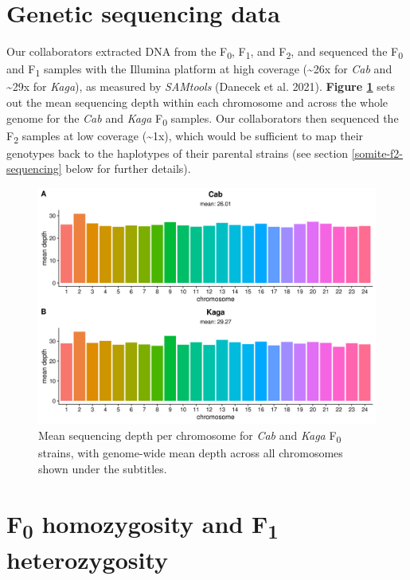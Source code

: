 \documentclass[
]{book}
\begin{document}
\clearpage

\hypertarget{genetic-sequencing-data}{%
\section{Genetic sequencing data}\label{genetic-sequencing-data}}

Our collaborators extracted DNA from the F\textsubscript{0}, F\textsubscript{1}, and F\textsubscript{2}, and sequenced the F\textsubscript{0} and F\textsubscript{1} samples with the Illumina platform at high coverage (\textasciitilde26x for \emph{Cab} and \textasciitilde29x for \emph{Kaga}), as measured by \emph{SAMtools} (Danecek et al. 2021). \textbf{Figure \ref{fig:F0-coverage}} sets out the mean sequencing depth within each chromosome and across the whole genome for the \emph{Cab} and \emph{Kaga} F\textsubscript{0} samples. Our collaborators then sequenced the F\textsubscript{2} samples at low coverage (\textasciitilde1x), which would be sufficient to map their genotypes back to the haplotypes of their parental strains (see section \ref{somite-f2-sequencing} below for further details).



\begin{figure}
\includegraphics[width=1\linewidth]{figs/somites/F0_coverage} \caption{Mean sequencing depth per chromosome for \emph{Cab} and \emph{Kaga} F\textsubscript{0} strains, with genome-wide mean depth across all chromosomes shown under the subtitles.}\label{fig:F0-coverage}
\end{figure}

\clearpage

\hypertarget{f0-homozygosity-and-f1-heterozygosity}{%
\section{\texorpdfstring{F\textsubscript{0} homozygosity and F\textsubscript{1} heterozygosity}{F0 homozygosity and F1 heterozygosity}}\label{f0-homozygosity-and-f1-heterozygosity}}
\end{document}
